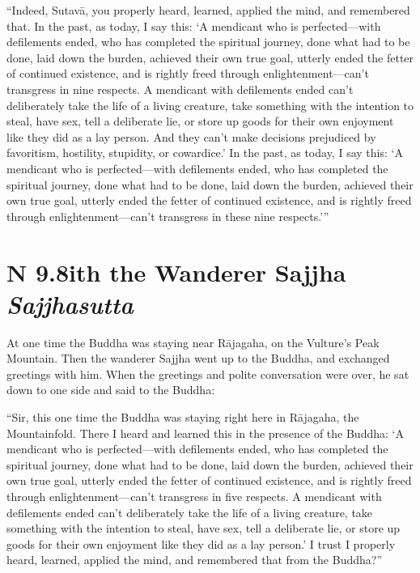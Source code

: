 \documentclass[12pt,openany]{book}%
\newcommand*{\suttatitleacronym}[1]{\smaller[2]{#1}\vspace*{.3em}}
\newcommand*{\suttatitletranslation}[1]{\linebreak{#1}}
\newcommand*{\suttatitleroot}[1]{\linebreak\smaller[2]\itshape{#1}}
\newcommand*{\tocacronym}[1]{\hspace*{-3.3em}{#1}\quad}
\newcommand*{\toctranslation}[1]{#1}
\newcommand*{\tocroot}[1]{(\textit{#1})}
\begin{document}
“Indeed, \textsanskrit{Sutavā}, you properly heard, learned, applied the mind, and remembered that. In the past, as today, I say this: ‘A mendicant who is perfected—with defilements ended, who has completed the spiritual journey, done what had to be done, laid down the burden, achieved their own true goal, utterly ended the fetter of continued existence, and is rightly freed through enlightenment—can’t transgress in nine respects. A mendicant with defilements ended can’t deliberately take the life of a living creature, take something with the intention to steal, have sex, tell a deliberate lie, or store up goods for their own enjoyment like they did as a lay person. And they can’t make decisions prejudiced by favoritism, hostility, stupidity, or cowardice.’ In the past, as today, I say this: ‘A mendicant who is perfected—with defilements ended, who has completed the spiritual journey, done what had to be done, laid down the burden, achieved their own true goal, utterly ended the fetter of continued existence, and is rightly freed through enlightenment—can’t transgress in these nine respects.’” 

%
\section*{{\suttatitleacronym AN 9.8}{\suttatitletranslation With the Wanderer Sajjha }{\suttatitleroot Sajjhasutta}}
\addcontentsline{toc}{section}{\tocacronym{AN 9.8} \toctranslation{With the Wanderer Sajjha } \tocroot{Sajjhasutta}}

At one time the Buddha was staying near \textsanskrit{Rājagaha}, on the Vulture’s Peak Mountain. Then the wanderer Sajjha went up to the Buddha, and exchanged greetings with him. When the greetings and polite conversation were over, he sat down to one side and said to the Buddha: 

“Sir, this one time the Buddha was staying right here in \textsanskrit{Rājagaha}, the Mountainfold. There I heard and learned this in the presence of the Buddha: ‘A mendicant who is perfected—with defilements ended, who has completed the spiritual journey, done what had to be done, laid down the burden, achieved their own true goal, utterly ended the fetter of continued existence, and is rightly freed through enlightenment—can’t transgress in five respects. A mendicant with defilements ended can’t deliberately take the life of a living creature, take something with the intention to steal, have sex, tell a deliberate lie, or store up goods for their own enjoyment like they did as a lay person.’ I trust I properly heard, learned, applied the mind, and remembered that from the Buddha?” 
\end{document}
